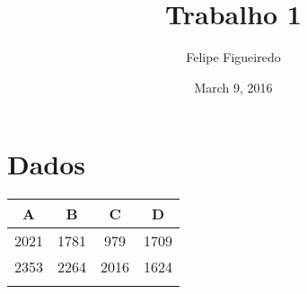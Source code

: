 \documentclass[]{article}
\title{Trabalho 1}
\author{Felipe Figueiredo}
\date{March 9, 2016}
\begin{document}
\maketitle


\section{Dados}\label{dados}

\begin{longtable}[c]{@{}cccc@{}}
\toprule
\begin{minipage}[b]{0.06\columnwidth}\centering\strut
A
\strut\end{minipage} &
\begin{minipage}[b]{0.06\columnwidth}\centering\strut
B
\strut\end{minipage} &
\begin{minipage}[b]{0.06\columnwidth}\centering\strut
C
\strut\end{minipage} &
\begin{minipage}[b]{0.06\columnwidth}\centering\strut
D
\strut\end{minipage}\tabularnewline
\midrule
\endhead
\begin{minipage}[t]{0.06\columnwidth}\centering\strut
2021
\strut\end{minipage} &
\begin{minipage}[t]{0.06\columnwidth}\centering\strut
1781
\strut\end{minipage} &
\begin{minipage}[t]{0.06\columnwidth}\centering\strut
979
\strut\end{minipage} &
\begin{minipage}[t]{0.06\columnwidth}\centering\strut
1709
\strut\end{minipage}\tabularnewline
\begin{minipage}[t]{0.06\columnwidth}\centering\strut
2353
\strut\end{minipage} &
\begin{minipage}[t]{0.06\columnwidth}\centering\strut
2264
\strut\end{minipage} &
\begin{minipage}[t]{0.06\columnwidth}\centering\strut
2016
\strut\end{minipage} &
\begin{minipage}[t]{0.06\columnwidth}\centering\strut
1624
\strut\end{minipage}\tabularnewline
\begin{minipage}[t]{0.06\columnwidth}\centering\strut

\end{minipage}
\end{longtable}
\end{document}
